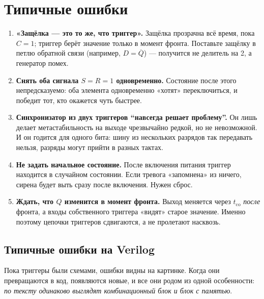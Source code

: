 \section{Типичные ошибки}

\begin{warnbox}
\begin{enumerate}
  \item \textbf{«Защёлка --- это то же, что триггер».} Защёлка прозрачна
        всё время, пока $C=1$; триггер берёт значение только в момент фронта.
        Поставьте защёлку в петлю обратной связи (например, $D=\overline{Q}$) ---
        получится не делитель на 2, а генератор помех.
  \item \textbf{Снять оба сигнала $S=R=1$ одновременно.} Состояние после этого
        непредсказуемо: оба элемента одновременно «хотят» переключиться, и
        победит тот, кто окажется чуть быстрее.
  \item \textbf{Синхронизатор из двух триггеров ``навсегда решает
        проблему''.} Он лишь делает метастабильность на выходе чрезвычайно
        редкой, но не невозможной. И он годится для одного бита: шину из
        нескольких разрядов так передавать нельзя, разряды могут прийти в
        разных тактах.
  \item \textbf{Не задать начальное состояние.} После включения питания
        триггер находится в случайном состоянии. Если тревога «запомнена» из
        ничего, сирена будет выть сразу после включения. Нужен сброс.
  \item \textbf{Ждать, что $Q$ изменится в момент фронта.} Выход меняется
        через $t_\text{co}$ \emph{после} фронта, а входы собственного триггера
        «видят» старое значение. Именно поэтому цепочки триггеров сдвигаются,
        а не пролетают насквозь.
\end{enumerate}
\end{warnbox}

\subsection{Типичные ошибки на Verilog}

Пока триггеры были схемами, ошибки видны на картинке. Когда они
превращаются в код, появляются новые, и все они родом из одной особенности:
\emph{по тексту одинаково выглядят комбинационный блок и блок с памятью}.

